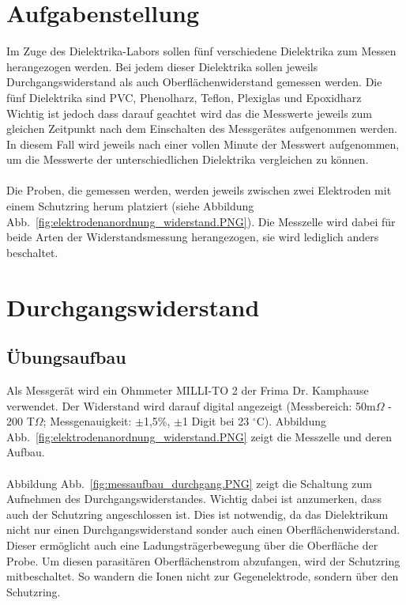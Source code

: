 \documentclass[a4paper,twoside,12pt,DIV=13,BCOR=5mm,numbers=noenddot,cleardoublepage=empty]{scrbook}
\begin{document}
        \section{Aufgabenstellung}
        Im Zuge des Dielektrika-Labors sollen f\"unf verschiedene Dielektrika 
        zum Messen herangezogen werden. Bei jedem dieser Dielektrika sollen 
        jeweils Durchgangswiderstand als auch Oberfl\"achenwiderstand gemessen 
        werden. Die f\"unf Dielektrika sind PVC, Phenolharz, Teflon, Plexiglas und 
        Epoxidharz\\
        Wichtig ist jedoch dass darauf geachtet wird das die Messwerte jeweils zum 
        gleichen Zeitpunkt nach dem Einschalten des Messger\"ates aufgenommen werden.
        In diesem Fall wird jeweils nach einer vollen Minute der Messwert 
        aufgenommen, um die Messwerte der unterschiedlichen Dielektrika vergleichen
        zu k\"onnen.
        \\
        \\
        Die Proben, die gemessen werden, werden jeweils zwischen zwei Elektroden
        mit einem Schutzring herum platziert (siehe Abbildung Abb.~\ref{fig:elektrodenanordnung_widerstand.PNG}).
        Die Messzelle wird dabei f\"ur beide Arten der Widerstandsmessung herangezogen,
        sie wird lediglich anders beschaltet.

        \section{Durchgangswiderstand}
            \subsection{\"Ubungsaufbau}
            Als Messger\"at wird ein Ohmmeter MILLI-TO 2 der Frima Dr. Kamphause 
            verwendet. Der Widerstand wird darauf digital angezeigt 
            (Messbereich: 50m$\Omega$ - 200 T$\Omega$; Messgenauigkeit: $\pm$1,5\%,
            $\pm$1 Digit bei 23 $^{\circ}$C). Abbildung 
            Abb.~\ref{fig:elektrodenanordnung_widerstand.PNG} zeigt die Messzelle und deren Aufbau.
            \\
            \\
            Abbildung Abb.~\ref{fig:messaufbau_durchgang.PNG} zeigt die Schaltung zum 
            Aufnehmen des Durchgangswiderstandes. Wichtig dabei ist anzumerken, dass auch 
            der Schutzring angeschlossen ist. Dies ist notwendig, da das Dielektrikum nicht nur 
            einen Durchgangswiderstand sonder auch einen Oberfl\"achenwiderstand. Dieser 
            erm\"oglicht auch eine Ladungstr\"agerbewegung \"uber die Oberfl\"ache der Probe.
            Um diesen parasit\"aren Oberfl\"achenstrom abzufangen, wird der Schutzring 
            mitbeschaltet. So wandern die Ionen nicht zur Gegenelektrode, sondern \"uber den Schutzring.
\end{document}
